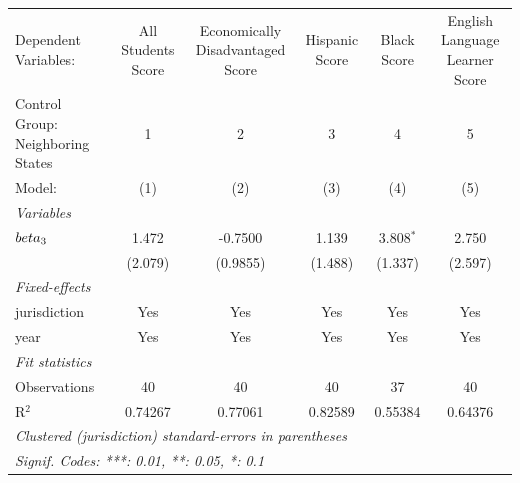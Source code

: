 
\begingroup
\centering
\begin{tabular}{lccccc}
   \tabularnewline \midrule \midrule
   Dependent Variables:              & All Students Score & Economically Disadvantaged Score & Hispanic Score & Black Score & English Language Learner Score\\  
   Control Group: Neighboring States & 1                  & 2                                & 3              & 4           & 5 \\   
   Model:                            & (1)                & (2)                              & (3)            & (4)         & (5)\\  
   \midrule
   \emph{Variables}\\
   $\\beta_3$                        & 1.472              & -0.7500                          & 1.139          & 3.808$^{*}$ & 2.750\\   
                                     & (2.079)            & (0.9855)                         & (1.488)        & (1.337)     & (2.597)\\   
   \midrule
   \emph{Fixed-effects}\\
   jurisdiction                      & Yes                & Yes                              & Yes            & Yes         & Yes\\  
   year                              & Yes                & Yes                              & Yes            & Yes         & Yes\\  
   \midrule
   \emph{Fit statistics}\\
   Observations                      & 40                 & 40                               & 40             & 37          & 40\\  
   R$^2$                             & 0.74267            & 0.77061                          & 0.82589        & 0.55384     & 0.64376\\  
   \midrule \midrule
   \multicolumn{6}{l}{\emph{Clustered (jurisdiction) standard-errors in parentheses}}\\
   \multicolumn{6}{l}{\emph{Signif. Codes: ***: 0.01, **: 0.05, *: 0.1}}\\
\end{tabular}
\par\endgroup


